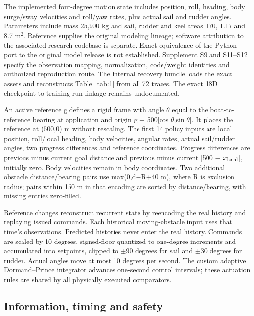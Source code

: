 \documentclass[conference]{IEEEtran}
\begin{document}
The implemented four-degree motion state includes position, roll, heading, body surge/sway velocities and roll/yaw rates, plus actual sail and rudder angles. Parameters include mass 25,900 kg and sail, rudder and keel areas 170, 1.17 and 8.7 m\ensuremath{^2}. Reference \cite{ref8} supplies the original modeling lineage; software attribution to the associated research codebase \cite{ref9} is separate. Exact equivalence of the Python port to the original model release is not established. Supplement S9 and S11--S12 specify the observation mapping, normalization, code/weight identities and authorized reproduction route. The internal recovery bundle loads the exact assets and reconstructs Table~\ref{tab:1} from all 72 traces. The exact 18D checkpoint-to-training-run linkage remains undocumented.

An active reference g defines a rigid frame with angle \ensuremath{\theta} equal to the boat-to-reference bearing at application and origin g \ensuremath{-} 500[cos \ensuremath{\theta},sin \ensuremath{\theta}]. It places the reference at (500,0) m without rescaling. The first 14 policy inputs are local position, roll/local heading, body velocities, angular rates, actual sail/rudder angles, two progress differences and reference coordinates. Progress differences are previous minus current goal distance and previous minus current |500 \ensuremath{-} $x_{\rm local}$|, initially zero. Body velocities remain in body coordinates. Two additional obstacle distance/bearing pairs use max(0,d\ensuremath{-}R+40 m), where R is exclusion radius; pairs within 150 m in that encoding are sorted by distance/bearing, with missing entries zero-filled.

Reference changes reconstruct recurrent state by reencoding the real history and replaying issued commands. Each historical moving-obstacle input uses that time's observations. Predicted histories never enter the real history. Commands are scaled by 10 degrees, signed-floor quantized to one-degree increments and accumulated into setpoints, clipped to \ensuremath{\pm}90 degrees for sail and \ensuremath{\pm}30 degrees for rudder. Actual angles move at most 10 degrees per second. The custom adaptive Dormand--Prince integrator advances one-second control intervals; these actuation rules are shared by all physically executed comparators.

\subsection{Information, timing and safety}
\end{document}
